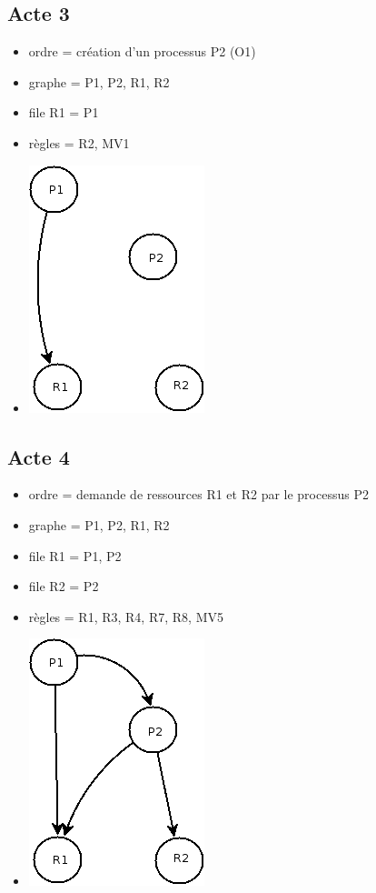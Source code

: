 \documentclass{article}
\newcommand{\bitem}{\item[\textbullet]}
\begin{document}
\subsection{Acte 3}
\begin{itemize}
  \bitem ordre = création d'un processus P2 (O1)
  \bitem graphe = P1, P2, R1, R2
  \bitem file R1 = P1
  \bitem règles = R2, MV1
  \bitem \includegraphics[scale=0.5]{images/acte3}
\end{itemize}
\subsection{Acte 4}
\begin{itemize}
  \bitem ordre = demande de ressources R1 et R2 par le processus P2
  \bitem graphe = P1, P2, R1, R2
  \bitem file R1 = P1, P2
  \bitem file R2 = P2
  \bitem règles = R1, R3, R4, R7, R8, MV5
  \bitem \includegraphics[scale=0.5]{images/acte4}
\end{itemize}
\end{document}
